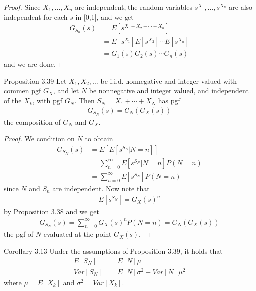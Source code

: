\begin{proof}
  Since $X_1, \ldots, X_n$ are independent, the random variables $s^{X_1}, \ldots, s^{X_n}$ are also independent for each $s$ in [0,1], and we get
  \begin{align*}
    G_{S_n}(s) &= E[s^{X_1 + X_2 + \cdots + X_n}]\\
    &= E[s^{X_1}]E[s^{X_2}] \cdots E[s^{X_n}]\\
    &= G_1(s)G_2(s) \cdots G_n(s)
  \end{align*}
  and we are done.
\end{proof}

\begin{boks}{Proposition 3.39}
  Let $X_1, X_2, \ldots$ be i.i.d. nonnegative and integer valued with commen pgf $G_X$, and let $N$ be nonnegative and integer valued, and independent of the $X_k$, with pgf $G_N$. Then $S_N = X_1 + \cdots + X_N$ has pgf
  \begin{align*}
    G_{S_N}(s) = G_N(G_X(s))
  \end{align*}
  the composition of $G_N$ and $G_X$.
\end{boks}

\begin{proof}
  We condition on $N$ to obtain
  \begin{align*}
    G_{S_N}(s) &= E\left[ E\left[ s^{S_N} | N = n \right] \right] \\
    &= \sum_{n = 0}^\infty E[s^{S_N} | N = n] P(N = n) \\
    &= \sum_{n = 0}^\infty E[s^{S_N}] P(N = n)
  \end{align*}
  since $N$ and $S_n$ are independent. Now note that
  \begin{align*}
    E[s^{S_N}] = G_X(s)^n
  \end{align*}
  by Proposition 3.38 and we get
  \begin{align*}
    G_{S_N}(s) = \sum_{n = 0}^\infty G_X(s)^n P(N = n) = G_N(G_X(s))
  \end{align*}
  the pgf of $N$ evaluated at the point $G_X(s)$.
\end{proof}

\begin{boks}{Corollary 3.13}
  Under the assumptions of Proposition 3.39, it holds that
  \begin{align*}
    E[S_N] &= E[N]\mu \\
    Var[S_N] &= E[N]\sigma^2 + Var[N]\mu^2
  \end{align*}
  where $\mu = E[X_k]$ and $\sigma^2 = Var[X_k]$.
\end{boks}


